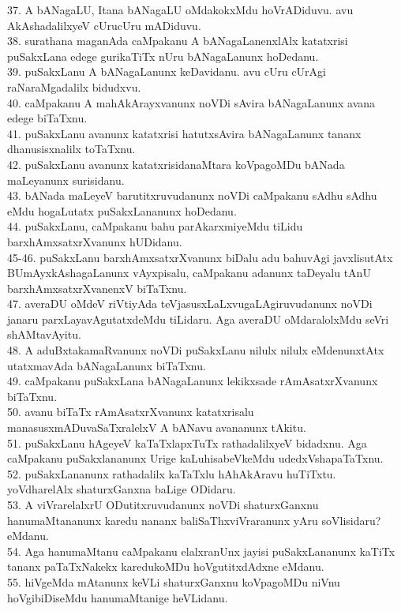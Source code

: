 \documentclass{article}
\begin{document}
37. A bANagaLU, Itana bANagaLU oMdakokxMdu hoVrADiduvu. avu AkAshadalilxyeV cUrucUru mADiduvu.\\
38. surathana maganAda caMpakanu A bANagaLanenxlAlx katatxrisi puSakxLana edege gurikaTiTx nUru bANagaLanunx hoDedanu.\\
39. puSakxLanu A bANagaLanunx keDavidanu. avu cUru cUrAgi raNaraMgadalilx bidudxvu.\\
40. caMpakanu A mahAkArayxvanunx noVDi sAvira bANagaLanunx avana edege biTaTxnu.\\
41. puSakxLanu avanunx katatxrisi hatutxsAvira bANagaLanunx tananx dhanusisxnalilx toTaTxnu.\\
42. puSakxLanu avanunx katatxrisidanaMtara koVpagoMDu bANada maLeyanunx surisidanu.\\
43. bANada maLeyeV barutitxruvudanunx noVDi caMpakanu sAdhu sAdhu eMdu hogaLutatx puSakxLananunx hoDedanu.\\
44. puSakxLanu, caMpakanu bahu parAkarxmiyeMdu tiLidu barxhAmxsatxrXvanunx hUDidanu.\\
45-46. puSakxLanu barxhAmxsatxrXvanunx biDalu adu bahuvAgi javxlisutAtx BUmAyxkAshagaLanunx vAyxpisalu, caMpakanu adanunx taDeyalu tAnU barxhAmxsatxrXvanenxV biTaTxnu.\\
47. averaDU oMdeV riVtiyAda teVjasusxLaLxvugaLAgiruvudanunx noVDi janaru parxLayavAgutatxdeMdu tiLidaru. Aga averaDU oMdaralolxMdu seVri shAMtavAyitu.\\
48. A aduBxtakamaRvanunx noVDi puSakxLanu nilulx nilulx eMdenunxtAtx utatxmavAda bANagaLanunx biTaTxnu.\\
49. caMpakanu puSakxLana bANagaLanunx lekikxsade rAmAsatxrXvanunx biTaTxnu.\\
50. avanu biTaTx rAmAsatxrXvanunx katatxrisalu manasusxmADuvaSaTxralelxV A bANavu avananunx tAkitu.\\
51. puSakxLanu hAgeyeV kaTaTxlapxTuTx rathadalilxyeV bidadxnu. Aga caMpakanu puSakxlananunx Urige kaLuhisabeVkeMdu udedxVshapaTaTxnu.\\
52. puSakxLananunx rathadalilx kaTaTxlu hAhAkAravu huTiTxtu. yoVdharelAlx shaturxGanxna baLige ODidaru.\\
53. A viVrarelalxrU ODutitxruvudanunx noVDi shaturxGanxnu hanumaMtananunx karedu nananx baliSaThxviVraranunx yAru soVlisidaru? eMdanu.\\
54. Aga hanumaMtanu caMpakanu elalxranUnx jayisi puSakxLananunx kaTiTx tananx paTaTxNakekx karedukoMDu hoVgutitxdAdxne eMdanu.\\
55. hiVgeMda mAtanunx keVLi shaturxGanxnu koVpagoMDu niVnu hoVgibiDiseMdu hanumaMtanige heVLidanu.\\
\end{document}
